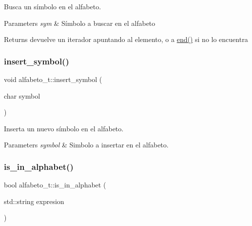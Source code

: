 Busca un símbolo en el alfabeto. 


\begin{DoxyParams}{Parameters}
{\em sym} & Símbolo a buscar en el alfabeto \\
\hline
\end{DoxyParams}
\begin{DoxyReturn}{Returns}
devuelve un iterador apuntando al elemento, o a \hyperlink{classalfabeto__t_a696e28d37a296c4160de83348a84846b}{end()} si no lo encuentra 
\end{DoxyReturn}
\mbox{\label{classalfabeto__t_a9239138c9b00eb97c332c48e4e95628e}} 
\subsubsection{\texorpdfstring{insert\+\_\+symbol()}{insert\_symbol()}}
{\footnotesize\ttfamily void alfabeto\+\_\+t\+::insert\+\_\+symbol (\begin{DoxyParamCaption}\item[{char}]{symbol }\end{DoxyParamCaption})}



Inserta un nuevo símbolo en el alfabeto. 


\begin{DoxyParams}{Parameters}
{\em symbol} & Simbolo a insertar en el alfabeto. \\
\hline
\end{DoxyParams}
\mbox{\label{classalfabeto__t_a62cded4fe4f780d6b13fe9d4d9c40c14}} 
\subsubsection{\texorpdfstring{is\+\_\+in\+\_\+alphabet()}{is\_in\_alphabet()}}
{\footnotesize\ttfamily bool alfabeto\+\_\+t\+::is\+\_\+in\+\_\+alphabet (\begin{DoxyParamCaption}\item[{std\+::string}]{expresion }\end{DoxyParamCaption})}



